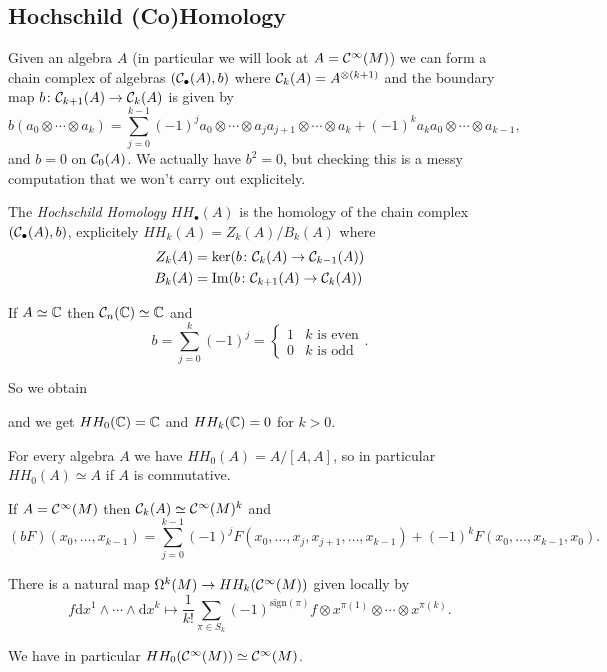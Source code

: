 \subsection{Hochschild (Co)Homology}
Given an algebra $A$ (in particular we will look at $A=\mathcal{C}^\infty(M)$) we can form a chain complex of algebras $(\mathcal{C}_\bullet(A),b)$ where $\mathcal{C}_k(A)=A^{\otimes(k+1)}$ and the boundary map $b\colon \mathcal{C}_{k+1}(A)\to\mathcal{C}_k(A)$ is given by 
$$b(a_0\otimes\cdots\otimes a_k)=\sum_{j=0}^{k-1}(-1)^ja_0\otimes\cdots\otimes a_ja_{j+1}\otimes\cdots\otimes a_k+(-1)^k a_ka_0\otimes\cdots\otimes a_{k-1},$$
and $b=0$ on $\mathcal{C}_0(A)$. We actually have $b^2=0$, but checking this is a messy computation that we won't carry out explicitely.

\begin{definition}
 The \emph{Hochschild Homology} $HH_\bullet(A)$ is the homology of the chain complex $(\mathcal{C}_\bullet(A),b)$, explicitely $HH_k(A)=Z_k(A)/B_k(A)$ where 
 \begin{align*}
  Z_k(A)&=\ker(b\colon\mathcal{C}_k(A)\to\mathcal{C}_{k-1}(A))\\
  B_k(A)&=\mathrm{Im}(b\colon\mathcal{C}_{k+1}(A)\to\mathcal{C}_k(A))
 \end{align*}
\end{definition}

\begin{example}
 If $A\simeq\mathbb{C}$ then $\mathcal{C}_n(\mathbb{C})\simeq\mathbb{C}$ and $$b=\sum_{j=0}^k(-1)^j=\begin{cases} 1 & k \text{ is even} \\ 0 & k\text{ is odd}\end{cases}.$$
 
 \noindent So we obtain  and we get $HH_0(\mathbb{C})=\mathbb{C}$ and $HH_k(\mathbb{C})=0$ for $k>0$.
\end{example}

\begin{lemma}
 For every algebra $A$ we have $HH_0(A)=A/[A,A]$, so in particular $HH_0(A)\simeq A$ if $A$ is commutative.
\end{lemma}

\begin{example}
 If $A=\mathcal{C}^\infty(M)$ then $\mathcal{C}_k(A)\simeq\mathcal{C}^\infty(M)^k$ and 
 $$(bF)(x_0,\ldots,x_{k-1})=\sum_{j=0}^{k-1}(-1)^j F(x_0,\ldots,x_j,x_{j+1},\ldots,x_{k-1})+(-1)^kF(x_0,\ldots,x_{k-1},x_0).$$
 
 \noindent There is a natural map $\Omega^k(M)\to HH_k(\mathcal{C}^\infty(M))$ given locally by 
 $$f\mathrm{d}x^1\wedge\cdots\wedge\mathrm{d}x^k\mapsto\frac1{k!}\sum_{\pi\in S_k}(-1)^{\mathrm{sign}(\pi)}f\otimes x^{\pi(1)}\otimes\cdots\otimes x^{\pi(k)}.$$
 
 \noindent We have in particular $HH_0(\mathcal{C}^\infty(M))\simeq\mathcal{C}^\infty(M)$.
\end{example}

